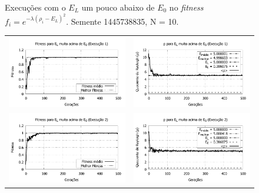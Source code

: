 \begin{figure}[htbp]
\begin{tabular}{@{}cc@{}}
		
  \end{tabular}
  \caption{Execuções com o $E_L$ um pouco abaixo de $E_0$ no \textit{fitness} $f_i = e^{-\lambda(\rho_i - E_L)^2}$. Semente 1445738835, N = 10.}
	\label{fig:variando_EL_pouco_abaixo}
	\end{figure}
	
		

	\begin{figure}[htbp]
	\centering
  \begin{tabular}{@{}cc@{}}
    
			
		\includegraphics[width=.49\textwidth]{figs/resultados/variandoEL/T3E1_fitness.pdf} &
    \includegraphics[width=.49\textwidth]{figs/resultados/variandoEL/T3E1_rho.pdf}   \\

		\includegraphics[width=.49\textwidth]{figs/resultados/variandoEL/T3E2_fitness.pdf} &
    \includegraphics[width=.49\textwidth]{figs/resultados/variandoEL/T3E2_rho.pdf}   \\
		

\end{tabular}
\end{figure}
